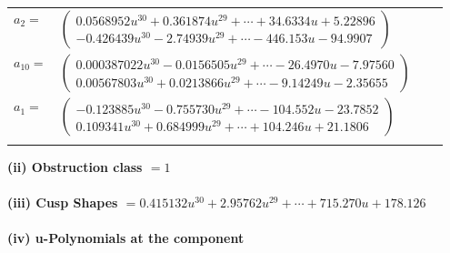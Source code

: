 \documentclass[1p]{elsarticle_modified}
\theoremstyle{definition}
\begin{document}
\begin{tabular}{m{7pt} m{180pt} m{7pt} m{180pt} }
\flushright $a_{2}=$&$\begin{pmatrix}0.0568952 u^{30}+0.361874 u^{29}+\cdots+34.6334 u+5.22896\\-0.426439 u^{30}-2.74939 u^{29}+\cdots-446.153 u-94.9907\end{pmatrix}$ \\
\flushright $a_{10}=$&$\begin{pmatrix}0.000387022 u^{30}-0.0156505 u^{29}+\cdots-26.4970 u-7.97560\\0.00567803 u^{30}+0.0213866 u^{29}+\cdots-9.14249 u-2.35655\end{pmatrix}$ \\
\flushright $a_{1}=$&$\begin{pmatrix}-0.123885 u^{30}-0.755730 u^{29}+\cdots-104.552 u-23.7852\\0.109341 u^{30}+0.684999 u^{29}+\cdots+104.246 u+21.1806\end{pmatrix}$\\&\end{tabular}
\flushleft \textbf{(ii) Obstruction class $= 1$}\\~\\
\flushleft \textbf{(iii) Cusp Shapes $= 0.415132 u^{30}+2.95762 u^{29}+\cdots+715.270 u+178.126$}\\~\\
\newpage\renewcommand{\arraystretch}{1}
\flushleft \textbf{(iv) u-Polynomials at the component}\newline \\
\end{document}
